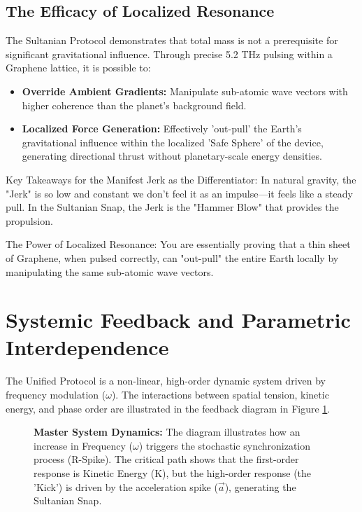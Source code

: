 \documentclass[11pt]{article}
\begin{document}
\subsection{The Efficacy of Localized Resonance}
The Sultanian Protocol demonstrates that total mass is not a prerequisite for significant gravitational influence. Through precise 5.2 THz pulsing within a Graphene lattice, it is possible to:
\begin{itemize}
    \item \textbf{Override Ambient Gradients:} Manipulate sub-atomic wave vectors with higher coherence than the planet's background field.
    \item \textbf{Localized Force Generation:} Effectively 'out-pull' the Earth's gravitational influence within the localized 'Safe Sphere' of the device, generating directional thrust without planetary-scale energy densities.
\end{itemize}

Key Takeaways for the Manifest
Jerk as the Differentiator: In natural gravity, the "Jerk" is so low and constant we don't feel it as an impulse—it feels like a steady pull. In the Sultanian Snap, the Jerk is the "Hammer Blow" that provides the propulsion.

The Power of Localized Resonance: You are essentially proving that a thin sheet of Graphene, when pulsed correctly, can "out-pull" the entire Earth locally by manipulating the same sub-atomic wave vectors.

\section{Systemic Feedback and Parametric Interdependence}

The Unified Protocol is a non-linear, high-order dynamic system driven by frequency modulation ($\omega$). The interactions between spatial tension, kinetic energy, and phase order are illustrated in the feedback diagram in Figure \ref{fig:feedback_loop}. 

\begin{figure}[h!]
    \centering
    \caption{\textbf{Master System Dynamics:} The diagram illustrates how an increase in Frequency ($\omega$) triggers the stochastic synchronization process (R-Spike). The critical path shows that the first-order response is Kinetic Energy (K), but the high-order response (the 'Kick') is driven by the acceleration spike ($\vec{a}$), generating the Sultanian Snap.}
    \label{fig:feedback_loop}
\end{figure}
\end{document}
